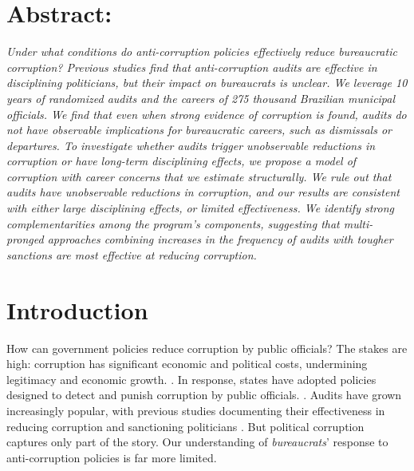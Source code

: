 \section*{Abstract:}
\emph{Under what conditions do anti-corruption policies effectively reduce bureaucratic corruption? Previous studies find that anti-corruption audits are effective in disciplining politicians, but their impact on bureaucrats is unclear. We leverage 10 years of randomized audits and the careers of 275 thousand Brazilian municipal officials. We find that even when strong evidence of corruption is found, audits do not have observable implications for bureaucratic careers, such as dismissals or departures. To investigate whether audits trigger unobservable reductions in corruption or have long-term disciplining effects, we propose a model of corruption with career concerns that we estimate structurally. We rule out that audits have unobservable reductions in corruption, and our results are consistent with either large disciplining effects, or limited effectiveness. We identify strong complementarities among the program’s components, suggesting that multi-pronged approaches combining increases in the frequency of audits with tougher sanctions are most effective at reducing corruption.}

\section{Introduction}
\label{sec:intro}

How can government policies reduce corruption by public officials? The stakes are high: corruption has significant economic and political costs, undermining legitimacy and economic growth. \citep[e.g.][]{RoseAckerman2016, Rothstein2011,fisman_are_2007}. In response, states have adopted policies designed to detect and punish corruption by public officials. \citep{chen2018busting}. Audits have grown increasingly popular, with previous studies documenting their effectiveness in reducing corruption and sanctioning politicians \citep{nyblade2008cheats, ferraz_electoral_2011,bobonis2016}. But political corruption captures only part of the story. Our understanding of \emph{bureaucrats}' response to anti-corruption policies is far more limited.

